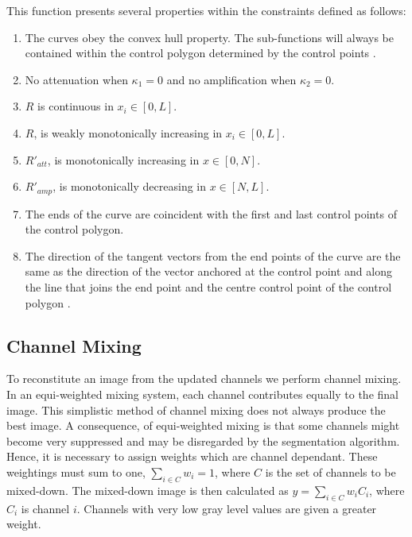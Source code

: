 \begin{definition}
This function presents several properties within the constraints defined as follows:
\begin{enumerate}
	\item
	The curves obey the convex hull property. The sub-functions will always be contained within the control polygon determined by the control points \citep{Vince2006,Marsh2005}.
	
	\item
	No attenuation when $\kappa_1=0$ and no amplification when $\kappa_2=0$.
	
	\item
	$R$ is continuous in $x_i \in [0,L]$.
	
	\item
	$R$, is weakly monotonically increasing in $x_i \in [0,L]$.
	
	\item
	$R'_{att}$, is monotonically increasing in $x \in [0, N]$.
	
	\item
	$R'_{amp}$, is monotonically decreasing in $x \in [N, L]$.
	
	\item
	The ends of the curve are coincident with the first and last control points of the control polygon.
	
	\item
	The direction of the tangent vectors from the end points of the curve are the same as the direction of the vector anchored at the control point and along the line that joins the end point and the centre control point of the control polygon \citep{Vince2006,Marsh2005}.
\end{enumerate}
\end{definition}



\subsection{Channel Mixing}
\label{sec:channelmixing}

To reconstitute an image from the updated channels we perform channel mixing. In an equi-weighted mixing system, each channel contributes equally to the final image. This simplistic method of channel mixing does not always produce the best image.
A consequence, of equi-weighted mixing is that some channels might become very suppressed and may be disregarded by the segmentation algorithm. Hence, it is necessary to assign weights which are channel dependant. These weightings must sum to one, $\sum_{i \in C} w_i = 1$, where $C$ is the set of channels to be mixed-down. The mixed-down image is then calculated as $y = \sum_{i \in C}w_iC_i$, where $C_i$ is channel $i$. Channels with very low gray level values are given a greater weight.

